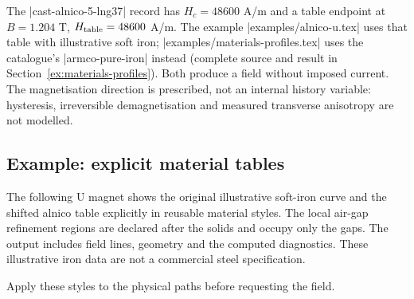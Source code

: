 The |cast-alnico-5-lng37| record has $H_c=48600$ A/m and a table endpoint
at $B=1.204$ T, $H_{\rm table}=48600$ A/m. The example
|examples/alnico-u.tex| uses that table with illustrative soft iron;
|examples/materials-profiles.tex| uses the catalogue's |armco-pure-iron| instead
(complete source and result in Section~\ref{ex:materials-profiles}).
Both produce a field without imposed current. The magnetisation direction
is prescribed, not an internal history variable: hysteresis, irreversible
demagnetisation and measured transverse anisotropy are not modelled.

\subsection{Example: explicit material tables}
The following U magnet shows the original illustrative soft-iron curve
and the shifted alnico table explicitly in reusable material styles.
The local air-gap refinement regions are declared after the solids and
occupy only the gaps. The output includes field lines, geometry and the
computed diagnostics. These illustrative iron data are not a commercial
steel specification.


\begin{codeexample}
\end{codeexample}

Apply these styles to the physical paths before requesting the field.


